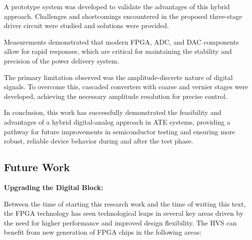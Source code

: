 A prototype system was developed to validate the advantages of this hybrid
approach.
Challenges and shortcomings encountered in the proposed
three-stage driver circuit were studied and solutions were provided.

Measurements demonstrated that modern \acs{FPGA}, \acs{ADC}, and \acs{DAC}
components allow for rapid responses, which are critical for maintaining
the stability and precision of the power delivery system.

The primary limitation observed was the amplitude-discrete nature of digital
signals.
To overcome this, cascaded converters with coarse and vernier stages were
developed, achieving the necessary amplitude resolution for precise control.

In conclusion, this work has successfully demonstrated the feasibility and
advantages of a hybrid digital-analog approach in \acs{ATE} systems, providing
a pathway for future improvements in semiconductor testing and ensuring more
robust, reliable device behavior during and after the test phase.

\subsection{Future Work}


\noindent\textbf{Upgrading the Digital Block:}

Between the time of starting this research work and the time of writing this
text, the \acs{FPGA} technology has seen technological leaps in several key
areas driven by the need for higher performance and improved design flexibility.
The \acs{HVS} can benefit from new generation of \acs{FPGA} chips
in the following areas:

